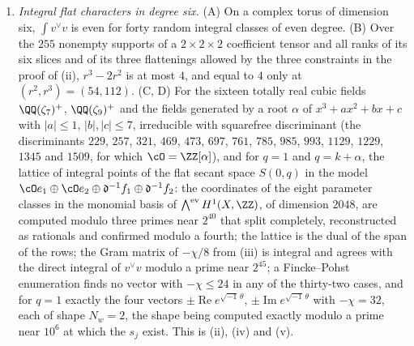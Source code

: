 \begin{enumerate}[label=\textup{(\Roman*)},leftmargin=*]
\item \emph{Integral flat characters in degree six.} (A) On a complex torus
  of dimension six, $\int v^{\vee}v$ is even for forty random integral
  classes of even degree. (B) Over the $255$ nonempty supports of a
  $2\times2\times2$ coefficient tensor and all ranks of its six slices and
  of its three flattenings allowed by the three constraints in the proof of
  (ii), $r^{3}-2r^{2}$ is at most $4$, and equal to
  $4$ only at $(r^{2},r^{3})=(54,112)$. (C, D) For the sixteen totally real
  cubic fields $\QQ(\zeta_{7})^{+}$, $\QQ(\zeta_{9})^{+}$ and the fields
  generated by a root $\alpha$ of $x^{3}+ax^{2}+bx+c$ with $|a|\le1$,
  $|b|,|c|\le7$, irreducible with squarefree discriminant (the discriminants
  $229$, $257$, $321$, $469$, $473$, $697$, $761$, $785$, $985$, $993$,
  $1129$, $1229$, $1345$ and $1509$, for which $\cO=\ZZ[\alpha]$), and for
  $q=1$ and $q=k+\alpha$, the lattice of integral points of the flat secant
  space $S(0,q)$ in the model
  $\cO e_{1}\oplus\cO e_{2}\oplus\mathfrak d^{-1}f_{1}\oplus\mathfrak d^{-1}f_{2}$:
  the coordinates of the eight parameter classes in the monomial basis of
  $\bigwedge^{\mathrm{ev}}H^{1}(X,\ZZ)$, of dimension $2048$, are computed
  modulo three primes near $2^{40}$ that split completely, reconstructed as
  rationals and confirmed modulo a fourth; the lattice is the dual of the
  span of the rows; the Gram matrix of $-\chi/8$ from
  (iii) is integral and agrees with the direct
  integral of $v^{\vee}v$ modulo a prime near $2^{45}$; a Fincke--Pohst
  enumeration finds no vector with $-\chi\le24$ in any of the thirty-two
  cases, and for $q=1$ exactly the four vectors $\pm\operatorname{Re}
  e^{\sqrt{-1}\,\theta}$, $\pm\operatorname{Im}e^{\sqrt{-1}\,\theta}$ with
  $-\chi=32$, each of shape $N_{w}=2$, the shape being computed exactly
  modulo a prime near $10^{6}$ at which the $s_{j}$ exist. This is
  (ii), (iv) and (v).


\end{enumerate}
